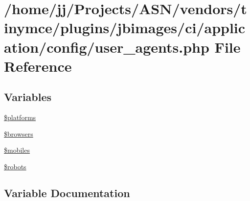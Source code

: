 \hypertarget{user__agents_8php}{}\section{/home/jj/\+Projects/\+A\+S\+N/vendors/tinymce/plugins/jbimages/ci/application/config/user\+\_\+agents.php File Reference}
\label{user__agents_8php}
\subsection*{Variables}
\begin{DoxyCompactItemize}
\item 
\hyperlink{user__agents_8php_a1c1a0a860242698ee6b3f4ef7d6eb343}{\$platforms}
\item 
\hyperlink{user__agents_8php_a81edf933083b5ac5b380385f59074a7d}{\$browsers}
\item 
\hyperlink{user__agents_8php_a6928dde5aa0be443766d5b2376de908a}{\$mobiles}
\item 
\hyperlink{user__agents_8php_a5752e2a66d1c03bc34666492746037ab}{\$robots}
\end{DoxyCompactItemize}


\subsection{Variable Documentation}
